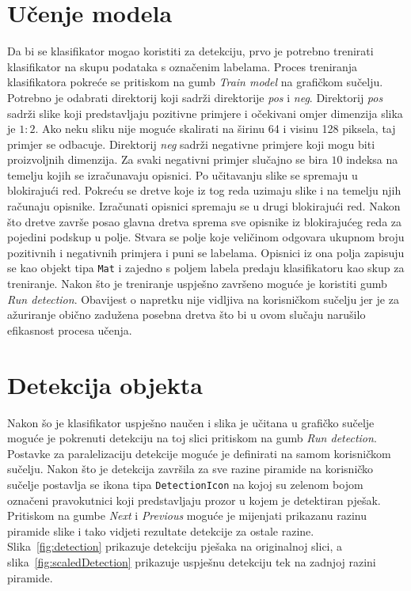\documentclass[times, utf8, zavrsni]{fer}
\begin{document}
\section{Učenje modela}
Da bi se klasifikator mogao koristiti za detekciju, prvo je potrebno trenirati klasifikator na skupu podataka s označenim labelama. Proces treniranja klasifikatora pokreće se pritiskom na gumb \textit{Train model} na grafičkom sučelju. Potrebno je odabrati direktorij koji sadrži direktorije \textit{pos} i \textit{neg}. Direktorij \textit{pos} sadrži slike koji predstavljaju pozitivne primjere i očekivani omjer dimenzija slika je \(1 : 2\). Ako neku sliku nije moguće skalirati na širinu 64 i visinu 128 piksela, taj primjer se odbacuje. Direktorij \textit{neg} sadrži negativne primjere koji mogu biti proizvoljnih dimenzija. Za svaki negativni primjer slučajno se bira \(10\) indeksa na temelju kojih se izračunavaju opisnici. Po učitavanju slike se spremaju u blokirajući red. Pokreću se dretve koje iz tog reda uzimaju slike i na temelju njih računaju opisnike. Izračunati opisnici spremaju se u drugi blokirajući red. Nakon što dretve završe posao glavna dretva sprema sve opisnike iz blokirajućeg reda za pojedini podskup u polje. Stvara se polje koje veličinom odgovara ukupnom broju pozitivnih i negativnih primjera i puni se labelama. Opisnici iz ona polja zapisuju se kao objekt tipa \verb|Mat| i zajedno s poljem labela predaju klasifikatoru kao skup za treniranje. Nakon što je treniranje uspješno završeno moguće je koristiti gumb \textit{Run detection}.  Obavijest o napretku nije vidljiva na korisničkom sučelju jer je za ažuriranje obično zadužena posebna dretva što bi u ovom slučaju narušilo efikasnost procesa učenja.

\section{Detekcija objekta}
Nakon šo je klasifikator uspješno naučen i slika je učitana u grafičko sučelje moguće je pokrenuti detekciju na toj slici pritiskom na gumb \textit{Run detection}. Postavke za paralelizaciju detekcije moguće je definirati na samom korisničkom sučelju. Nakon što je detekcija završila za sve razine piramide na korisničko sučelje postavlja se ikona tipa \verb|DetectionIcon| na kojoj su zelenom bojom označeni pravokutnici koji predstavljaju prozor u kojem je detektiran pješak. Pritiskom na gumbe \textit{Next} i \textit{Previous} moguće je mijenjati prikazanu razinu piramide slike i tako vidjeti rezultate detekcije za  ostale razine. Slika~\ref{fig:detection} prikazuje detekciju pješaka na originalnoj slici, a slika~\ref{fig:scaledDetection} prikazuje uspješnu detekciju tek na zadnjoj razini piramide.
\end{document}
